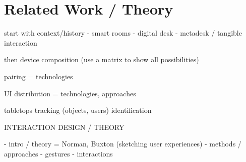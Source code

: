 \chapter{Related Work / Theory}
\label{relatedwork}

start with context/history
- smart rooms
- digital desk
- metadesk / tangible interaction

then device composition (use a matrix to show all possibilities)

pairing = technologies

UI distribution = technologies, approaches

tabletops
tracking (objects, users)
identification

INTERACTION DESIGN / THEORY

- intro / theory = Norman, Buxton (sketching user experiences)
- methods / approaches
- gestures
- interactions
